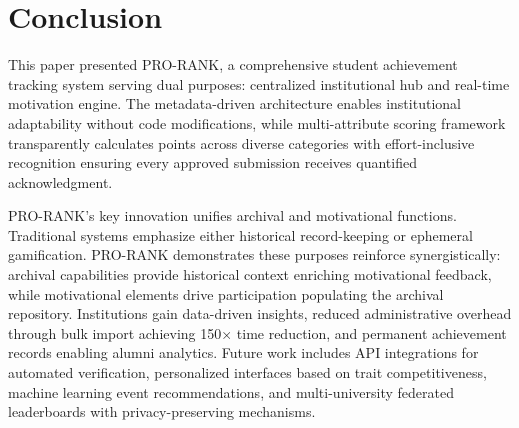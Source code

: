 \documentclass[conference]{IEEEtran}
\begin{document}
\section{Conclusion}

This paper presented PRO-RANK, a comprehensive student achievement tracking system serving dual purposes: centralized institutional hub and real-time motivation engine. The metadata-driven architecture enables institutional adaptability without code modifications, while multi-attribute scoring framework transparently calculates points across diverse categories with effort-inclusive recognition ensuring every approved submission receives quantified acknowledgment.

PRO-RANK's key innovation unifies archival and motivational functions. Traditional systems emphasize either historical record-keeping or ephemeral gamification. PRO-RANK demonstrates these purposes reinforce synergistically: archival capabilities provide historical context enriching motivational feedback, while motivational elements drive participation populating the archival repository. Institutions gain data-driven insights, reduced administrative overhead through bulk import achieving 150× time reduction, and permanent achievement records enabling alumni analytics. Future work includes API integrations for automated verification, personalized interfaces based on trait competitiveness, machine learning event recommendations, and multi-university federated leaderboards with privacy-preserving mechanisms.
\end{document}
